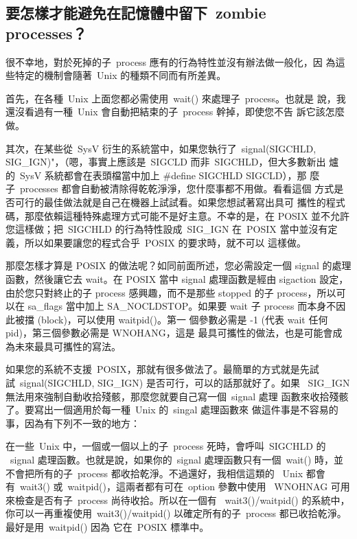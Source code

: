 \documentclass{article}
\begin{document}
\begin{CJK*}{Bg5}{ming}
\subsection{要怎樣才能避免在記憶體中留下~zombie processes？}

	很不幸地，對於死掉的子~process 應有的行為特性並沒有辦法做一般化，因
	為這些特定的機制會隨著~Unix 的種類不同而有所差異。      

	首先，在各種~Unix 上面您都必需使用~wait() 來處理子~process。也就是
	說，我還沒看過有一種~Unix 會自動把結束的子~process 幹掉，即使您不告
	訴它該怎麼做。

	其次，在某些從~SysV 衍生的系統當中，如果您執行了~signal(SIGCHLD, 
	SIG\_IGN)"，（嗯，事實上應該是~SIGCLD 而非~SIGCHLD，但大多數新出
	爐的~SysV 系統都會在表頭檔當中加上 \#define SIGCHLD SIGCLD），那
	麼子~processes 都會自動被清除得乾乾淨淨，您什麼事都不用做。看看這個
	方式是否可行的最佳做法就是自己在機器上試試看。如果您想試著寫出具可
	攜性的程式碼，那麼依賴這種特殊處理方式可能不是好主意。不幸的是，在 
	POSIX 並不允許您這樣做；把~SIGCHLD 的行為特性設成~SIG\_IGN 在~POSIX 
        當中並沒有定義，所以如果要讓您的程式合乎~POSIX 的要求時，就不可以
        這樣做。

	那麼怎樣才算是 POSIX 的做法呢？如同前面所述，您必需設定一個 signal 
	的處理函數，然後讓它去 wait。在 POSIX 當中 signal 處理函數是經由 
	sigaction 設定，由於您只對終止的子 process 感興趣，而不是那些 stopped 
	的子 process，所以可以在 sa\_flags 當中加上 SA\_NOCLDSTOP。如果要 
	wait 子 process 而本身不因此被擋 (block)，可以使用 waitpid()。第一
        個參數必需是 -1 (代表 wait 任何 pid)，第三個參數必需是 WNOHANG，這是
	最具可攜性的做法，也是可能會成為未來最具可攜性的寫法。

	如果您的系統不支援~POSIX，那就有很多做法了。最簡單的方式就是先試
	試~signal(SIGCHLD, SIG\_IGN) 是否可行，可以的話那就好了。如果 
	~SIG\_IGN 無法用來強制自動收拾殘骸，那麼您就要自己寫一個~signal 處理
	函數來收拾殘骸了。要寫出一個適用於每一種~Unix 的~singal 處理函數來
	做這件事是不容易的事，因為有下列不一致的地方：

	在一些~Unix 中，一個或一個以上的子~process 死時，會呼叫~SIGCHLD 的 
	~signal 處理函數。也就是說，如果你的~signal 處理函數只有一個~wait() 
        時，並不會把所有的子~process 都收拾乾淨。不過還好，我相信這類的 
        ~Unix 都會有~wait3() 或~waitpid()，這兩者都有可在~option 參數中使用
        ~WNOHNAG 可用來檢查是否有子~process 尚待收拾。所以在一個有 
        ~wait3()/waitpid() 的系統中，你可以一再重複使用~wait3()/waitpid() 
        以確定所有的子~process 都已收拾乾淨。最好是用~waitpid() 因為
        它在~POSIX 標準中。


\end{CJK*}
\end{document}

